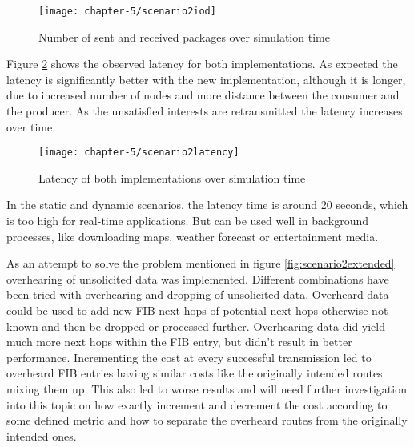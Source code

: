 \begin{figure}[H]
  \centering
  \texttt{[image: chapter-5/scenario2iod]}
  \caption{Number of sent and received packages over simulation time}
  \label{fig:scenario2iod}
\end{figure}

Figure \ref{fig:scenario2latency} shows the observed latency for both implementations. As expected the latency is significantly better with the new implementation, although it is longer, due to increased number of nodes and more distance between the consumer and the producer. As the unsatisfied interests are retransmitted the latency increases over time.

\begin{figure}[H]
  \centering
  \texttt{[image: chapter-5/scenario2latency]}
  \caption{Latency of both implementations over simulation time}
  \label{fig:scenario2latency}
\end{figure}

In the static and dynamic scenarios, the latency time is around 20 seconds, which is too high for real-time applications. But can be used well in background processes, like downloading maps, weather forecast or entertainment media.

As an attempt to solve the problem mentioned in figure \ref{fig:scenario2extended} overhearing of unsolicited data was implemented. Different combinations have been tried with overhearing and dropping of unsolicited data. Overheard data could be used to add new FIB next hops of potential next hops otherwise not known and then be dropped or processed further. Overhearing data did yield much more next hops within the FIB entry, but didn't result in better performance. Incrementing the cost at every successful transmission led to overheard FIB entries having similar costs like the originally intended routes mixing them up. This also led to worse results and will need further investigation into this topic on how exactly increment and decrement the cost according to some defined metric and how to separate the overheard routes from the originally intended ones.


